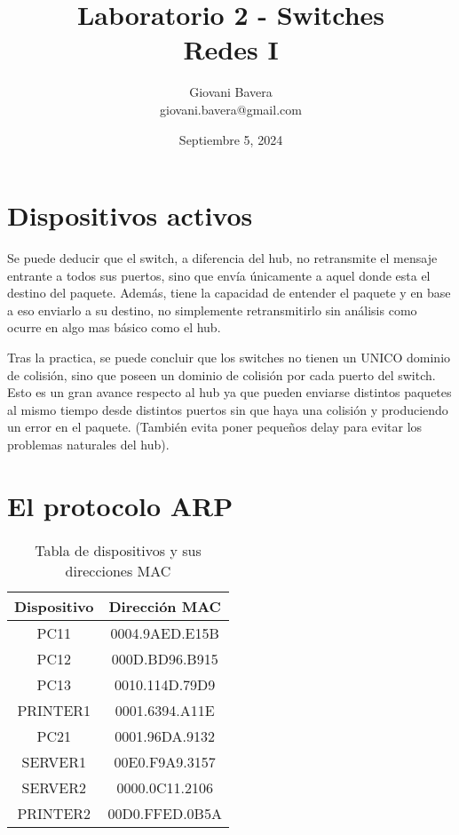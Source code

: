 \documentclass{article}
\title{Laboratorio 2 - Switches \\ Redes I}
\author{Giovani Bavera \\ giovani.bavera@gmail.com}
\date{Septiembre 5, 2024}
\begin{document}
\maketitle

\section{Dispositivos activos}

Se puede deducir que el switch, a diferencia del hub, no retransmite el mensaje entrante a todos sus puertos, sino que envía únicamente a aquel donde esta el destino del paquete. Además, tiene la capacidad de entender el paquete y en base a eso enviarlo a su destino, no simplemente retransmitirlo sin análisis como ocurre en algo mas básico como el hub.  

Tras la practica, se puede concluir que los switches no tienen un UNICO dominio de colisión, sino que poseen un dominio de colisión por cada puerto del switch. Esto es un gran avance respecto al hub ya que pueden enviarse distintos paquetes al mismo tiempo desde distintos puertos sin que haya una colisión y produciendo un error en el paquete. (También evita poner pequeños delay para evitar los problemas naturales del hub).

\section{El protocolo ARP}

\begin{table}[h!]
\centering
\begin{tabular}{|c|c|}
\hline
\textbf{Dispositivo} & \textbf{Dirección MAC} \\ \hline\hline
    PC11 & 0004.9AED.E15B \\ \hline
    PC12 & 000D.BD96.B915 \\ \hline
    PC13 & 0010.114D.79D9 \\ \hline
    PRINTER1 & 0001.6394.A11E \\ \hline
    PC21 & 0001.96DA.9132 \\ \hline
    SERVER1 & 00E0.F9A9.3157 \\ \hline
    SERVER2 & 0000.0C11.2106 \\ \hline
    PRINTER2 & 00D0.FFED.0B5A \\ \hline
\end{tabular}
\caption{Tabla de dispositivos y sus direcciones MAC}
\end{table}
\end{document}
